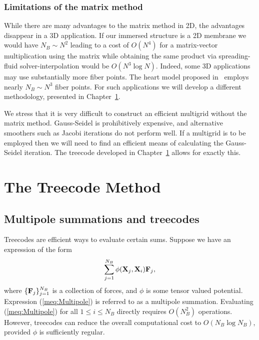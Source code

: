 \subsection{Limitations of the matrix method}
While there are many advantages to the matrix method in 2D, the advantages disappear in a 3D application. If our immersed structure is a 2D membrane we would have $N_B \sim N^2$ leading to a cost of  $O(N^4)$ for a matrix-vector multiplication using the matrix  while obtaining the same product via spreading-fluid solver-interpolation would be $O(N^3\log N)$. Indeed, some 3D applications may use substantially more fiber points. The heart model proposed in~\cite{McQueenPeskin2000} employs nearly $N_B  \sim N^3$ fiber points. For such applications we will develop a different methodology, presented in Chapter~\ref{part:Treecode}.

We stress that it is very difficult to construct an efficient multigrid without the matrix method. Gauss-Seidel is prohibitively expensive, and alternative smoothers such as Jacobi iterations do not perform well. If a multigrid is to be employed then we will need to find an efficient means of calculating the Gauss-Seidel iteration. The treecode developed in Chapter~\ref{part:Treecode} allows for exactly this.






\chapter{The Treecode Method}
\label{part:Treecode}
\noindent
\section{Multipole summations and treecodes}
\label{Sec:Treecode}
Treecodes are efficient ways to evaluate certain sums. Suppose we have an expression of the form
\begin{equation}
\sum_{j=1}^{N_B} \phi(\mathbf{X}_j, \mathbf{X}_i) \mathbf{F}_j,
\label{meq:Multipole}
\end{equation}
where $\{\mathbf{F}_j\}_{j=1}^{N_B}$ is a collection of forces, and $\phi$ is some tensor valued potential.
Expression (\ref{meq:Multipole}) is referred to as a multipole summation. Evaluating (\ref{meq:Multipole}) for all $1\leq i\leq N_B$  directly requires $O(N_B^2)$ operations. However, treecodes can reduce the overall computational cost to $O(N_B\log N_B)$, provided  $\phi$ is sufficiently regular.

